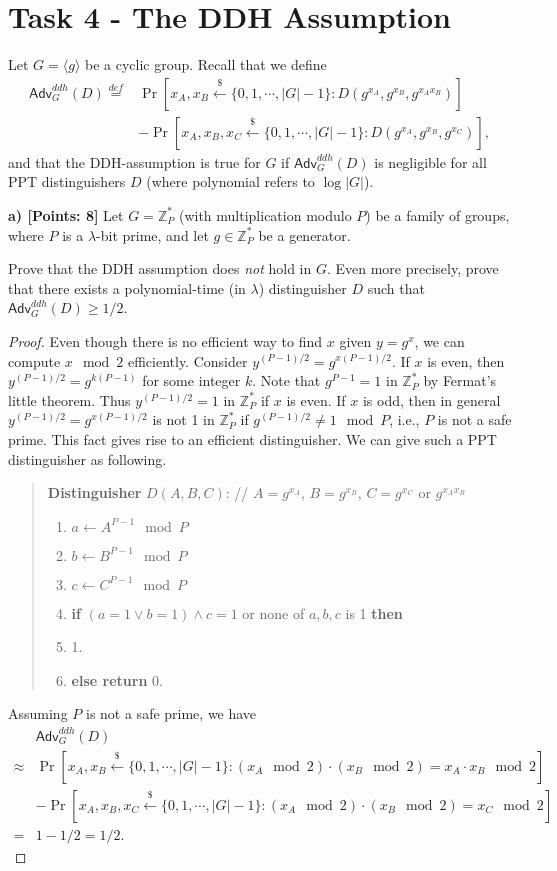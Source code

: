 \documentclass[12pt]{article}
\newcommand{\eqdef}{\stackrel{def}{=}}
\newcommand{\Z}{\mathbb{Z}}
\newcommand{\getsr}{\stackrel{\$}{\gets}}
\newcommand{\angles}[1]{\langle #1 \rangle}
\newcommand{\Adv}{\textsf{Adv}}
\newcommand{\tab}{\hspace{0.3in}}
\theoremstyle{definition}
\begin{document}
\section{Task 4 - The DDH Assumption}
Let $G = \angles{g}$ be a cyclic group. Recall that we define
$$\begin{aligned}
\Adv_G^{ddh}(D) \eqdef & \Pr[x_A, x_B \getsr \{0, 1, \cdots, |G|-1\} : D(g^{x_A}, g^{x_B}, g^{x_Ax_B})] \\
&- \Pr[x_A, x_B, x_C \getsr \{0, 1, \cdots, |G|-1\} : D(g^{x_A}, g^{x_B}, g^{x_C})],
\end{aligned}$$
and that the DDH-assumption is true for $G$ if $\Adv_G^{ddh}(D)$ is negligible for all PPT distinguishers $D$ (where polynomial refers to $\log |G|$).

{\bf a) [Points: 8]} Let $G = \Z_P^*$ (with multiplication modulo $P$) be a family of groups, where $P$ is a $\lambda$-bit prime, and let $g \in \Z_P^*$ be a generator.

Prove that the DDH assumption does \emph{not} hold in $G$. Even more precisely, prove that there exists a polynomial-time (in $\lambda$) distinguisher $D$ such that $\Adv_G^{ddh}(D) \geq 1/2$.

\begin{proof}
Even though there is no efficient way to find $x$ given $y = g^x$, we can compute $x \mod 2$ efficiently. Consider $y^{(P-1)/2} = g^{x(P-1)/2}$. If $x$ is even, then $y^{(P-1)/2} = g^{k(P-1)}$ for some integer $k$. Note that $g^{P-1}=1$ in $\Z_P^*$ by Fermat's little theorem. Thus $y^{(P-1)/2} = 1$ in $\Z_P^*$ if $x$ is even. If $x$ is odd, then in general $y^{(P-1)/2} = g^{x(P-1)/2}$ is not 1 in $\Z_P^*$ if $g^{(P-1)/2}\not=1 \mod P$, i.e., $P$ is not a safe prime.
This fact gives rise to an efficient distinguisher. 
We can give such a PPT distinguisher as following.
\begin{quote}
{\bf Distinguisher} $D (A, B, C)$: // $A = g^{x_A}$, $B = g^{x_B}$, $C = g^{x_C}$ or $g^{x_Ax_B}$
\begin{enumerate}
\item $a \gets A^{P-1} \mod P$
\item $b \gets B^{P-1} \mod P$
\item $c \gets C^{P-1} \mod P$
\item {\bf if} $(a=1 \vee b=1) \wedge c=1$ or none of $a, b, c$ is 1 {\bf then}
\item \tab {\bf return} 1.
\item {\bf else return} 0.
\end{enumerate}
\end{quote}
Assuming $P$ is not a safe prime, we have
$$\begin{aligned}
& \Adv_{G}^{ddh}(D) \\
\approx & \Pr[x_A, x_B \getsr \{0, 1, \cdots, |G|-1\} : (x_A\mod 2)\cdot (x_B \mod 2) = x_A\cdot x_B \mod 2] \\
&- \Pr[x_A, x_B, x_C \getsr \{0, 1, \cdots, |G|-1\} : (x_A\mod 2)\cdot (x_B \mod 2) = x_C \mod 2] \\
=& 1 - 1/2 = 1/2.
\end{aligned}$$
\end{proof}
\end{document}
